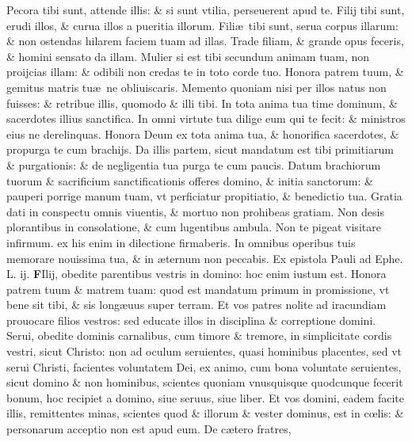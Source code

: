 \documentclass[a5paper,10pt]{book}
\def\leftmarginnote{%
	\lrmarginnote{\hskip -\marginparsep \hskip -6.5em}}
\def\ae{æ}
\def\oe{œ}
\begin{document}
\begin{multicols*}{2}
Pecora tibi sunt, attende illis: \& si sunt vtilia, perseuerent apud te. Filij tibi sunt, erudi illos, \& curua illos a pueritia illorum.
Fili\ae \ tibi sunt, serua corpus illarum: \& non ostendas hilarem faciem tuam ad illas. Trade filiam, \& grande opus feceris, \& homini sensato da illam.
Mulier si est tibi secundum animam tuam, non proijcias illam: \& odibili non credas te in toto corde tuo. Honora patrem tuum, \& gemitus matris tu\ae \ ne obliuiscaris.
Memento quoniam nisi per illos natus non fuisses: \& retribue illis, quomodo \& illi tibi.
In tota anima tua time dominum, \& sacerdotes illius sanctifica. In omni virtute tua dilige eum qui te fecit: \& ministros eius ne derelinquas.
Honora Deum ex tota anima tua, \& honorifica sacerdotes, \& propurga te cum brachijs. Da illis partem, sicut mandatum est tibi primitiarum \& purgationis: \&
de negligentia tua purga te cum paucis.
Datum brachiorum tuorum \& sacrificium sanctificationis offeres domino, \& initia sanctorum: \& pauperi porrige manum tuam, vt perficiatur propitiatio, \& benedictio tua.
Gratia dati in conspectu omnis viuentis, \& mortuo non prohibeas gratiam. Non desis plorantibus in consolatione, \& cum lugentibus ambula.
Non te pigeat visitare infirmum. ex his enim in dilectione firmaberis. In omnibus operibus tuis memorare nouissima tua, \& in \ae ternum non peccabis.
\newline {} \color{red} Ex epistola Pauli ad Ephe. \hfill L. ij. \color{black}
\vspace{-1.25em}
\lettrine[lines=2]{\bfseries \color{red} F}{}Ilij,\leftmarginnote{\begin{flushright}ca. 6.\end{flushright}} obedite parentibus vestris in domino: hoc enim iustum est.
Honora patrem tuum \& matrem tuam: quod est mandatum primum in promissione, vt bene sit tibi, \& sis long\ae uus super terram.
Et vos patres nolite ad iracundiam prouocare filios vestros: sed educate illos in disciplina \& correptione domini. Serui, obedite dominis carnalibus, cum timore \& tremore, in simplicitate cordis vestri, sicut Christo: non ad oculum seruientes, quasi hominibus placentes, sed vt serui Christi, facientes voluntatem Dei, ex animo, cum bona voluntate seruientes, sicut domino \& non hominibus, scientes quoniam vnusquisque quodcunque fecerit bonum, hoc recipiet a domino, siue seruus, siue liber.
Et vos domini, eadem facite illis, remittentes minas, scientes quod \& illorum \& vester dominus, est in c\oe lis: \& personarum acceptio non est apud eum.
De c\ae tero fratres, \textdagger \ 

\end{multicols*}
\end{document}
